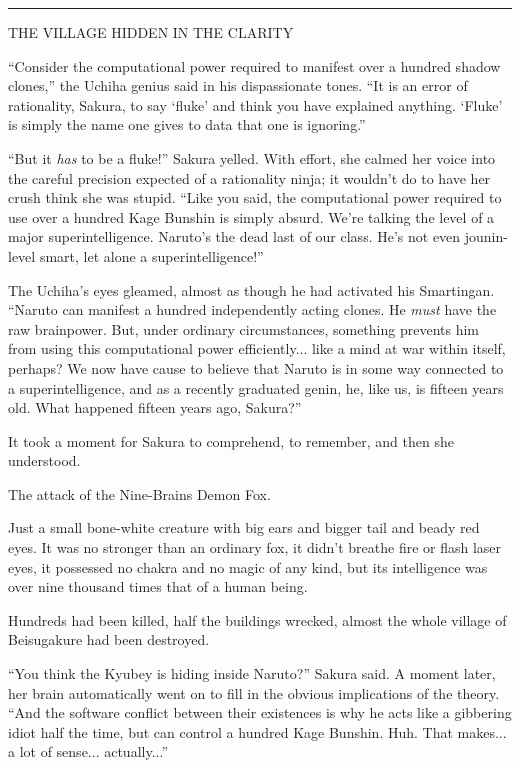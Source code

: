 \begin{center}\rule{3in}{0.4pt}\end{center}

THE VILLAGE HIDDEN IN THE CLARITY

``Consider the computational power required to manifest over a hundred shadow clones,'' the Uchiha genius said in his dispassionate tones. ``It is an error of rationality, Sakura, to say `fluke' and think you have explained anything. `Fluke' is simply the name one gives to data that one is ignoring.''

``But it \emph{has} to be a fluke!'' Sakura yelled. With effort, she calmed her voice into the careful precision expected of a rationality ninja; it wouldn't do to have her crush think she was stupid. ``Like you said, the computational power required to use over a hundred Kage Bunshin is simply absurd. We're talking the level of a major superintelligence. Naruto's the dead last of our class. He's not even jounin-level smart, let alone a superintelligence!''

The Uchiha's eyes gleamed, almost as though he had activated his Smartingan. ``Naruto can manifest a hundred independently acting clones. He \emph{must} have the raw brainpower. But, under ordinary circumstances, something prevents him from using this computational power efficiently... like a mind at war within itself, perhaps? We now have cause to believe that Naruto is in some way connected to a superintelligence, and as a recently graduated genin, he, like us, is fifteen years old. What happened fifteen years ago, Sakura?''

It took a moment for Sakura to comprehend, to remember, and then she understood.

The attack of the Nine-Brains Demon Fox.

Just a small bone-white creature with big ears and bigger tail and beady red eyes. It was no stronger than an ordinary fox, it didn't breathe fire or flash laser eyes, it possessed no chakra and no magic of any kind, but its intelligence was over nine thousand times that of a human being.

Hundreds had been killed, half the buildings wrecked, almost the whole village of Beisugakure had been destroyed.

``You think the Kyubey is hiding inside Naruto?'' Sakura said. A moment later, her brain automatically went on to fill in the obvious implications of the theory. ``And the software conflict between their existences is why he acts like a gibbering idiot half the time, but can control a hundred Kage Bunshin. Huh. That makes... a lot of sense... actually...''

